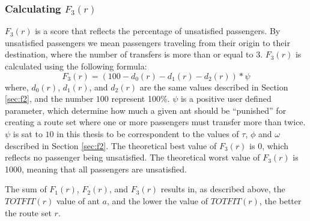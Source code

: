 \subsubsection{Calculating $F_{3}(r)$}
\label{sec:f3}
$F_3(r)$ is a score that reflects the percentage of unsatisfied passengers. By unsatisfied passengers we mean passengers traveling from their origin to their destination, where the number of transfers is more than or equal to 3. $F_3(r)$ is calculated using the following formula:
\newline
$$F_3(r) = (100 - d_0(r) - d_1(r) - d_2(r))*\psi$$
\newline
where, $d_0(r)$, $d_1(r)$, and $d_2(r)$ are the same values described in Section \vref{sec:f2}, and the number $100$ represent 100\%. $\psi$ is a positive user defined parameter, which determine how much a given ant should be ``punished'' for creating a route set where one or more passengers must transfer more than twice. $\psi$ is sat to $10$ in this thesis to be correspondent to the values of $\tau$, $\phi$ and $\omega$ described in Section \vref{sec:f2}. The theoretical best value of $F_3(r)$ is 0, which reflects no passenger being unsatisfied. The theoretical worst value of $F_3(r)$ is 1000, meaning that all passengers are unsatisfied.

The sum of $F_{1}(r)$, $F_{2}(r)$, and $F_{3}(r)$ results in, as described above, the $TOTFIT(r)$ value of ant $a$, and the lower the value of $TOTFIT(r)$, the better the route set $r$. 

